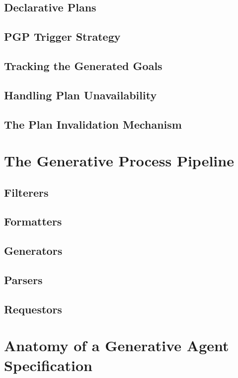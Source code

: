 \documentclass[12pt,a4paper,openright,twoside]{book}
\begin{document}
\subsection{Declarative Plans}

\subsection{PGP Trigger Strategy}

\subsection{Tracking the Generated Goals}

\subsection{Handling Plan Unavailability}

\subsection{The Plan Invalidation Mechanism}

\section{The Generative Process Pipeline}

\subsection{Filterers}

\subsection{Formatters}

\subsection{Generators}

\subsection{Parsers}

\subsection{Requestors}

\section{Anatomy of a Generative Agent Specification}\label{sec:writing}
\end{document}
